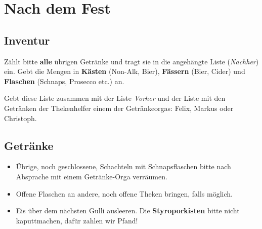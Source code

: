 \section{Nach dem Fest}
\subsection{Inventur}
Zählt bitte \textbf{alle} übrigen Getränke und tragt sie in die angehängte Liste (\emph{Nachher}) ein. Gebt die Mengen in \textbf{Kästen} (Non-Alk, Bier), \textbf{Fässern} (Bier, Cider) und \textbf{Flaschen} (Schnaps, Prosecco etc.) an.

Gebt diese Liste zusammen mit der Liste \emph{Vorher} und der Liste mit den Getränken der Thekenhelfer einem der Getränkeorgas: Felix, Markus oder Christoph.
\subsection{Getränke}
\begin{itemize}
  \item Übrige, noch geschlossene, Schachteln mit Schnapsflaschen bitte nach Absprache mit einem Getränke-Orga verräumen.
  \item Offene Flaschen an andere, noch offene Theken bringen, falls möglich.
  \item Eis über dem nächsten Gulli ausleeren. Die \textbf{Styroporkisten} bitte nicht kaputtmachen, dafür zahlen wir Pfand!
\end{itemize}
